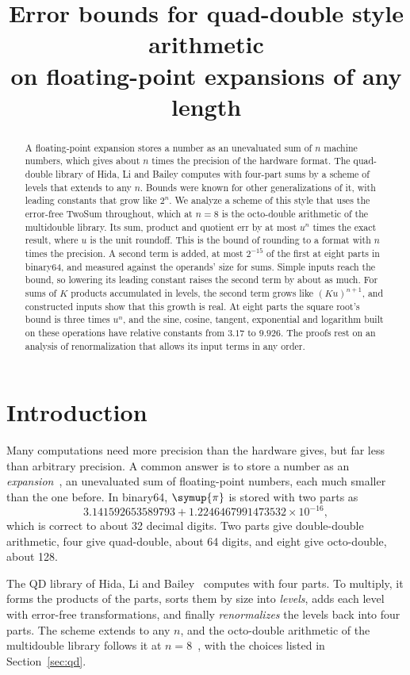 \documentclass[conference]{IEEEtran}
\title{Error bounds for quad-double style arithmetic\\on floating-point expansions of any length}
\author{\IEEEauthorblockN{Nathan Moinvaziri}\IEEEauthorblockA{November 2026}}
\date{}
\theoremstyle{definition}
\theoremstyle{remark}
\newcommand{\cpi}{\symup{\pi}}
\begin{document}
\maketitle

\begin{abstract}
\mdseries A floating-point expansion stores a number as an unevaluated sum of $n$ machine numbers, which gives about $n$ times
the precision of the hardware format. The quad-double library of Hida, Li and Bailey computes with four-part sums by a
scheme of levels that extends to any $n$. Bounds were known for other generalizations of it, with leading constants
that grow like $2^n$. We analyze a scheme of this style that uses the error-free TwoSum throughout, which at $n = 8$ is
the octo-double arithmetic of the multidouble library. Its sum, product and quotient err by at most $u^n$ times the
exact result, where $u$ is the unit roundoff. This is the bound of rounding to a format with $n$ times the precision.
A second term is added, at most $2^{-15}$ of the first at eight parts in binary64, and measured against the operands'
size for sums. Simple inputs reach the bound, so lowering its leading constant raises the second term by about as
much. For sums of $K$ products accumulated in levels, the second term grows like $(Ku)^{n+1}$, and constructed inputs
show that this growth is real. At eight parts the square root's bound is three times $u^n$, and the sine, cosine,
tangent, exponential and logarithm built on these operations have relative constants from $3.17$ to $9.926$. The
proofs rest on an analysis of renormalization that allows its input terms in any order.
\end{abstract}

\section{Introduction}

Many computations need more precision than the hardware gives, but far less than arbitrary precision. A common answer
is to store a number as an \emph{expansion}~\cite{Priest91,Shewchuk97}, an unevaluated sum of floating-point numbers, each much
smaller than the one before. In binary64, $\cpi$ is stored with two parts as
\[
3.141592653589793 + 1.2246467991473532 \times 10^{-16},
\]
which is correct to about 32 decimal digits. Two parts give double-double arithmetic, four give quad-double, about 64
digits, and eight give octo-double, about 128.

The QD library of Hida, Li and Bailey~\cite{HLB01} computes with four parts. To multiply, it forms the products of
the parts, sorts them by size into \emph{levels}, adds each level with error-free transformations, and finally
\emph{renormalizes} the levels back into four parts. The scheme extends to any $n$, and the octo-double arithmetic of
the multidouble library follows it at $n = 8$~\cite{md}, with the choices listed in Section~\ref{sec:qd}.
\end{document}
